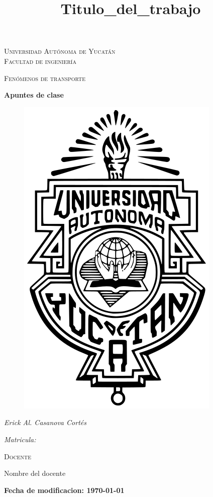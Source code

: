 \documentclass[11pt]{report}
\theoremstyle{plain}
\theoremstyle{definition}
\begin{document}
\begin{titlepage}
\title{Titulo_del_trabajo}


	\centering
	{\scshape\LARGE Universidad Autónoma de Yucatán  \\ Facultad de ingeniería\par}
	\vspace{1cm}
	{\scshape\Large Fenómenos de transporte\par}
	\vspace{1.5cm}
	{\huge\bfseries Apuntes de clase\par}
	\vspace{0.7cm}
	{\begin{figure}[!h]
	\centering
    \includegraphics[scale=0.3]{UADY.png}
	\end{figure}}
	\vspace{0.7cm}
	{\Large\itshape Erick Al. Casanova Cortés\par}
	{\Large\itshape Matricula: \par}
	\vfill
	{\scshape\Large Docente\par
	Nombre del docente\par}
	\vfill
	{\Large{\bfseries Fecha de modificacion: \today} }

	\vfill
	
\end{titlepage}
\end{document}

